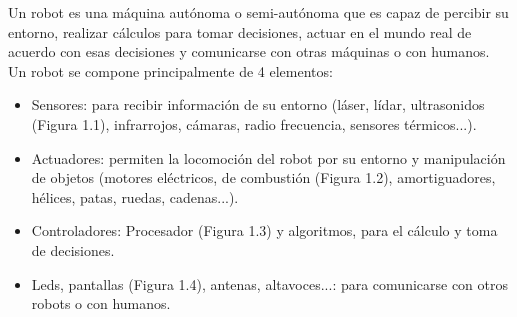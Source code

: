 Un robot es una máquina autónoma o semi-autónoma que es capaz de percibir su entorno, realizar cálculos para tomar decisiones, actuar en el mundo real de acuerdo con esas decisiones y comunicarse con otras máquinas o con humanos. Un robot se compone principalmente de 4 elementos:
\begin{itemize}
  \item Sensores: para recibir información de su entorno (láser, lídar, ultrasonidos (Figura 1.1), infrarrojos, cámaras, radio frecuencia, sensores térmicos...). 
   
  \item Actuadores:  permiten la locomoción del robot por su entorno y manipulación de objetos (motores eléctricos, de combustión (Figura 1.2), amortiguadores, hélices, patas, ruedas, cadenas...). 
  

  \item  Controladores: Procesador (Figura 1.3) y algoritmos, para el cálculo y toma de decisiones. 
 
  \item Leds, pantallas (Figura 1.4), antenas, altavoces...: para comunicarse con otros robots o con humanos.
\end{itemize}
